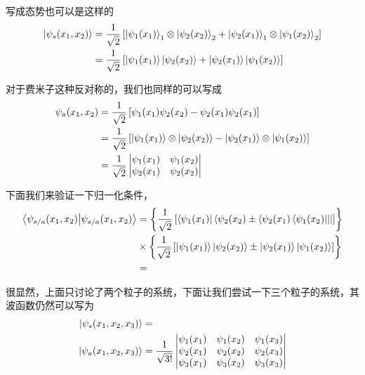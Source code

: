 \documentclass{article}
\newcommand{\vmtwo}[4]{\begin{vmatrix}#1&#2\\#3&#4\end{vmatrix}}
\newcommand{\vmthree}[9]{
    \begin{vmatrix}
        #1&#2&#3\\
        #4&#5&#6\\
        #7&#8&#9
    \end{vmatrix}
}
\begin{document}
写成态势也可以是这样的
\begin{align*}
    \ket{\psi_s(x_1,x_2)}&=\frac{1}{\sqrt{2}}\left[\ket{\psi_1(x_1)}_1\otimes\ket{\psi_2(x_2)}_2+\ket{\psi_2(x_1)}_1\otimes\ket{\psi_1(x_2)}_2\right]\\
    &=\frac{1}{\sqrt{2}}\left[\ket{\psi_1(x_1)}\ket{\psi_2(x_2)}+\ket{\psi_2(x_1)}\ket{\psi_1(x_2)}\right]
\end{align*}

对于费米子这种反对称的，我们也同样的可以写成
\begin{align*}
    \psi_{a}(x_1,x_2)&=\frac{1}{\sqrt{2}}\left[\psi_1(x_1)\psi_2(x_2)-\psi_2(x_1)\psi_2(x_1)\right]\\
    &=\frac{1}{\sqrt{2}}\left[\ket{\psi_1(x_1)}\otimes\ket{\psi_2(x_2)}-\ket{\psi_2(x_1)}\otimes\ket{\psi_1(x_2)}\right]\\
    &=\frac{1}{\sqrt{2}}\vmtwo{\psi_1(x_1)}{\psi_1(x_2)}{\psi_2(x_1)}{\psi_2(x_2)}
\end{align*}

下面我们来验证一下归一化条件，
\begin{align*}
    \braket{\psi_{s/a}(x_1,x_2)}{\psi_{s/a}(x_1,x_2)}&=\left\{\frac{1}{\sqrt{2}}\left[\bra{\psi_1(x_1)}\bra{\psi_2(x_2)\pm\bra{\psi_2(x_1)\bra{\psi_1(x_2)}}}\right]\right\}\\
    &\times\left\{\frac{1}{\sqrt{2}}\left[\ket{\psi_1(x_1)}\ket{\psi_2(x_2)}\pm\ket{\psi_2(x_1)}\ket{\psi_1(x_2)}\right]\right\}\\
    &=
\end{align*}

很显然，上面只讨论了两个粒子的系统，下面让我们尝试一下三个粒子的系统，其波函数仍然可以写为
\begin{align*}
    \ket{\psi_s(x_1,x_2,x_3)}&=\\
    \ket{\psi_a(x_1,x_2,x_3)}&=\frac{1}{\sqrt{3!}}\vmthree{\psi_1(x_1)}{\psi_1(x_2)}{\psi_1(x_3)}{\psi_2(x_1)}{\psi_2(x_2)}{\psi_2(x_3)}{\psi_3(x_1)}{\psi_3(x_2)}{\psi_3(x_3)}
\end{align*}
\end{document}
